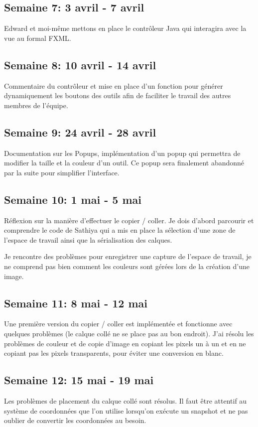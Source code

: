 \subsection{Semaine 7: 3 avril - 7 avril}
Edward et moi-même mettons en place le contrôleur Java qui interagira avec la vue au formal FXML.
\subsection{Semaine 8: 10 avril - 14 avril}
Commentaire du contrôleur et mise en place d'un fonction pour générer dynamiquement les boutons des outils afin de faciliter le travail des autres membres de l'équipe.
\subsection{Semaine 9: 24 avril - 28 avril}
Documentation sur les Popups, implémentation d'un popup qui permettra de modifier la taille et la couleur d'un outil. Ce popup sera finalement abandonné par la suite pour simplifier l'interface.
\subsection{Semaine 10: 1 mai - 5 mai}
Réflexion sur la manière d'effectuer le copier / coller. Je dois d'abord parcourir et comprendre le code de Sathiya qui a mis en place la sélection d'une zone de l'espace de travail ainsi que la sérialisation des calques.

Je rencontre des problèmes pour enregistrer une capture de l'espace de travail, je ne comprend pas bien comment les couleurs sont gérées lors de la création d'une image.
\subsection{Semaine 11: 8 mai - 12 mai}
Une première version du copier / coller est implémentée et fonctionne avec quelques problèmes (le calque collé ne se place pas au bon endroit). J'ai résolu les problèmes de couleur et de copie d'image en copiant les pixels un à un et en ne copiant pas les pixels transparents, pour éviter une conversion en blanc.
\subsection{Semaine 12: 15 mai - 19 mai}
Les problèmes de placement du calque collé sont résolus. Il faut être attentif au système de coordonnées que l'on utilise lorsqu'on exécute un snapshot et ne pas oublier de convertir les coordonnées au besoin.

